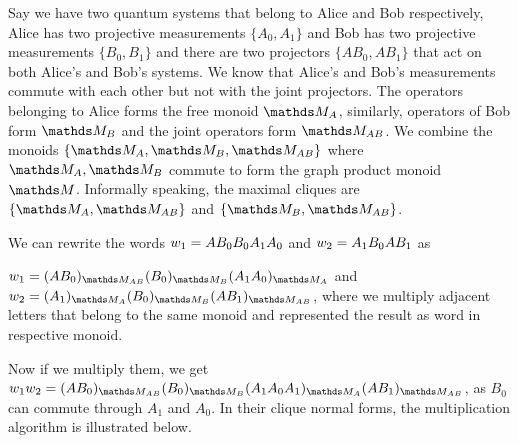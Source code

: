 \begin{example}
Say we have two quantum systems  that belong to Alice and Bob respectively, Alice has two projective measurements $\{A_0,A_1\}$ and Bob has two projective measurements $\{B_0,B_1\}$ and there are two projectors $\{AB_0,AB_1\}$ that act on both Alice's and Bob's systems.  We know that Alice's and Bob's measurements commute with each other but not with the joint projectors. The operators belonging to Alice forms the free monoid $\monoid_A $, similarly, operators of Bob form $\monoid_B$ and the joint operators form $\monoid_{AB}$. We combine the monoids $\{\monoid_A,\monoid_B,\monoid_{AB}\}$ where $\monoid_A,\monoid_B$ commute to form the graph product monoid $\monoid$. Informally speaking, the maximal cliques are $\{\monoid_A,\monoid_{AB}\}$ and $\{\monoid_B,\monoid_{AB}\}$.

We can rewrite the words $w_1 = AB_0  B_0  A_1  A_0$ and $w_2= A_1  B_0  AB_1$ as 

$w_1 = (AB_0)_{\monoid_{AB}} \mult (B_0)_{\monoid_B} \mult (A_1 \mult A_0)_{\monoid_A}$ and $w_2= (A_1)_{\monoid_A} \mult (B_0)_{\monoid_B} \mult (AB_1)_{\monoid_{AB}}$, where we multiply adjacent letters that belong to the same monoid and represented the result as word in respective monoid. 

Now if we multiply them, we get $w_1 \mult w_2 = (AB_0)_{\monoid_{AB}} \mult (B_0)_{\monoid_B} \mult (A_1 \mult A_0 \mult A_1)_{\monoid_A} \mult (AB_1)_{\monoid_{AB}}$, as $B_0$ can commute through $A_1$ and $A_0$.
In their clique normal forms, the multiplication algorithm is illustrated below.


\begin{figure}[H]
\centering
\label{fig:graph_product_multiplication}
\end{figure}
\end{example}
